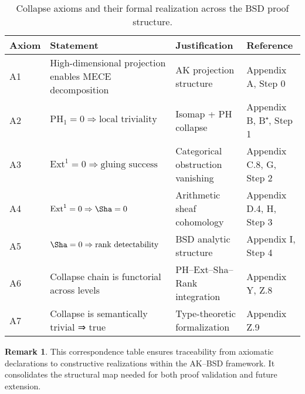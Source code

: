 \documentclass[11pt]{article}
\theoremstyle{definition}
\newtheorem{remark}[theorem]{Remark}
\begin{document}
\begin{table}[H]
\centering
\begin{tabular}{llll}
\toprule
\textbf{Axiom} & \textbf{Statement} & \textbf{Justification} & \textbf{Reference} \\
\midrule
A1 & High-dimensional projection enables MECE decomposition & AK projection structure & Appendix A, Step 0 \\
A2 & \( \mathrm{PH}_1 = 0 \Rightarrow \text{local triviality} \) & Isomap + PH collapse & Appendix B, B⁺, Step 1 \\
A3 & \( \mathrm{Ext}^1 = 0 \Rightarrow \text{gluing success} \) & Categorical obstruction vanishing & Appendix C.8, G, Step 2 \\
A4 & \( \mathrm{Ext}^1 = 0 \Rightarrow \Sha = 0 \) & Arithmetic sheaf cohomology & Appendix D.4, H, Step 3 \\
A5 & \( \Sha = 0 \Rightarrow \text{rank detectability} \) & BSD analytic structure & Appendix I, Step 4 \\
A6 & Collapse chain is functorial across levels & PH–Ext–Sha–Rank integration & Appendix Y, Z.8 \\
A7 & Collapse is semantically trivial ⇒ true & Type-theoretic formalization & Appendix Z.9 \\
\bottomrule
\end{tabular}
\caption{Collapse axioms and their formal realization across the BSD proof structure.}
\end{table}

\begin{remark}
This correspondence table ensures traceability from axiomatic declarations  
to constructive realizations within the AK–BSD framework.  
It consolidates the structural map needed for both proof validation and future extension.
\end{remark}
\end{document}
